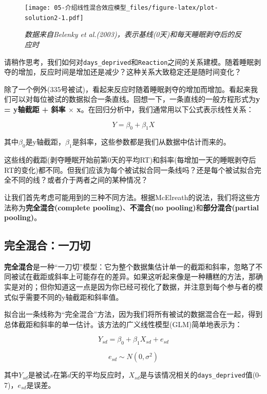 \documentclass[
]{book}
\begin{document}
\begin{figure}
\centering
\texttt{[image: 05-介绍线性混合效应模型\_files/figure-latex/plot-solution2-1.pdf]}
\caption{\label{fig:plot-solution2}\emph{数据来自Belenky et al.(2003)，表示基线(0天)和每天睡眠剥夺后的反应时}}
\end{figure}

请稍作思考，我们如何对\texttt{days\_deprived}和\texttt{Reaction}之间的关系建模。随着睡眠剥夺的增加，反应时间是增加还是减少？这种关系大致稳定还是随时间变化？

除了一个例外(335号被试)，看起来反应时随着睡眠剥夺的增加而增加。看起来我们可以对每位被试的数据拟合一条直线。回想一下，一条直线的一般方程形式为\textbf{y = y轴截距 + 斜率 \(\times\) x}。在回归分析中，我们通常用以下公式表示线性关系：

\[Y = \beta_0 + \beta_1 X\]

其中\(\beta_0\)是y轴截距，\(\beta_1\)是斜率，这些参数都是我们从数据中估计而来的。

这些线的截距(剥夺睡眠开始前第0天的平均RT)和斜率(每增加一天的睡眠剥夺后RT的变化)都不同。但我们应该为每个被试拟合同一条线吗？还是每个被试拟合完全不同的线？或者介于两者之间的某种情况？

让我们首先考虑可能用到的三种不同方法。根据McElreath的说法，我们将这些方法称为\textbf{完全混合(complete pooling)}、\textbf{不混合(no pooling)}和\textbf{部分混合(partial pooling)}。

\hypertarget{ux5b8cux5168ux6df7ux5408ux4e00ux5200ux5207}{%
\subsection{完全混合：一刀切}\label{ux5b8cux5168ux6df7ux5408ux4e00ux5200ux5207}}

\textbf{完全混合}是一种``一刀切''模型：它为整个数据集估计单一的截距和斜率，忽略了不同被试在截距或斜率上可能存在的差异。如果这听起来像是一种糟糕的方法，那确实是对的；但你知道这一点是因为你已经可视化了数据，并注意到每个参与者的模式似乎需要不同的y轴截距和斜率值。

拟合出一条线称为``完全混合''方法，因为我们将所有被试的数据混合在一起，得到总体截距和斜率的单一估计。该方法的广义线性模型(GLM)简单地表示为：

\[Y_{sd} = \beta_0 + \beta_1 X_{sd} + e_{sd}\]

\[e_{sd} \sim N\left(0, \sigma^2\right)\]

其中\(Y_{sd}\)是被试\(s\)在第\(d\)天的平均反应时，\(X_{sd}\)是与该情况相关的\texttt{days\_deprived}值(0-7)，\(e_{sd}\)是误差。
\end{document}
